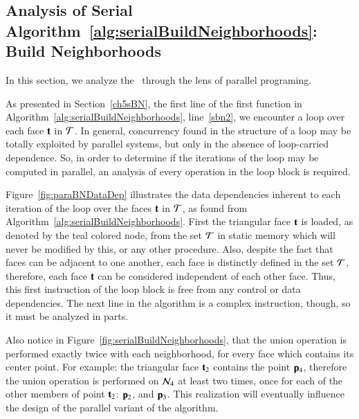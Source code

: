 %
%
\subsection{Analysis of Serial Algorithm~\ref{alg:serialBuildNeighborhoods}: Build Neighborhoods}
\label{ch6sBNPssASABN}
In this section, we analyze the~ through the lens of parallel programing.

As presented in Section~\ref{ch5sBN}, the first line of the first function in Algorithm~\ref{alg:serialBuildNeighborhoods}, line~\ref{sbn2}, we encounter a loop over each face $\mathbf{t}$ in $\mathcal{T}$. In general, concurrency found in the structure of a loop may be totally exploited by parallel systems, but only in the absence of loop-carried dependence. So, in order to determine if the iterations of the loop may be computed in parallel, an analysis of every operation in the loop block is required.

Figure~\ref{fig:paraBNDataDep} illustrates the data dependencies inherent to each iteration of the loop over the faces $\mathbf{t}$ in $\mathcal{T}$, as found from Algorithm~\ref{alg:serialBuildNeighborhoods}. First the triangular face $\mathbf{t}$ is loaded, as denoted by the teal colored node, from the set $\mathcal{T}$ in static memory which will never be modified by this, or any other procedure. Also, despite the fact that faces can be adjacent to one another, each face is distinctly defined in the set $\mathcal{T}$, therefore, each face $\mathbf{t}$ can be considered independent of each other face. Thus, this first instruction of the loop block is free from any control or data dependencies. The next line in the algorithm is a complex instruction, though, so it must be analyzed in parts.

Also notice in Figure~\ref{fig:serialBuildNeighborhoods}, that the union operation is performed exactly twice with each neighborhood, for every face which contains its center point. For example: the triangular face $\mathbf{t}_2$ contains the point $\mathbf{p}_4$, therefore the union operation is performed on $\mathcal{N}_4$ at least two times, once for each of the other members of point $\mathbf{t}_2$: $\mathbf{p}_2$, and $\mathbf{p}_3$. This realization will eventually influence the design of the parallel variant of the algorithm.

